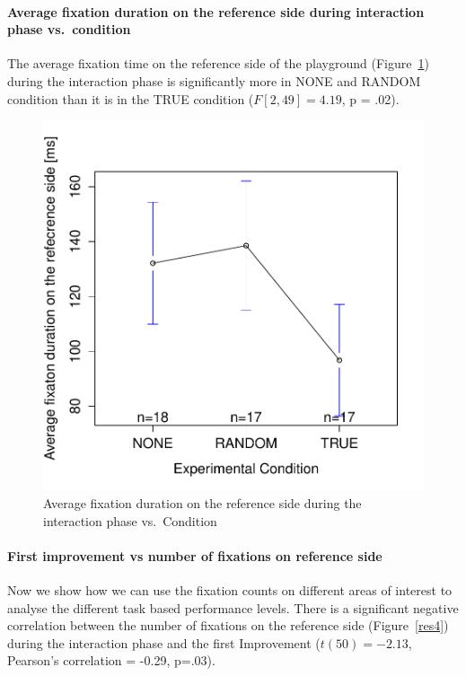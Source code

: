 \documentclass{sig-alternate}
\begin{document}
\paragraph{Average fixation duration on the reference side during interaction
phase vs.~condition}

The average fixation time on the reference side of the playground
(Figure~\ref{res3}) during the interaction phase is significantly more in {\sf NONE}
and {\sf RANDOM} condition than it is in the {\sf TRUE} condition ($F[2,49]=4.19$,
p = .02).

\begin{figure}[h!]
    \centering
    \includegraphics[width=0.8\linewidth]{meanPlotFixReference}
    \caption{Average fixation duration on the reference side during the
    interaction phase vs.~Condition}
    \label{res3}
\end{figure}

\paragraph{First improvement vs number of fixations on reference side}

Now we show how we can use the fixation counts on different areas of interest to analyse the different task based performance levels. There is a significant negative correlation between the number of
fixations on the reference side (Figure~\ref{res4}) during the interaction phase
and the first Improvement ($t(50)=-2.13$, Pearson's correlation = -0.29, p=.03).
\end{document}
